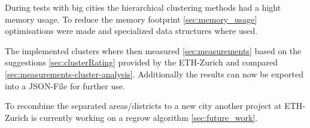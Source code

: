 During tests with big cities the hierarchical clustering methods had a hight memory usage. To reduce the memory footprint \ref{sec:memory_usage} optimisations were made and specialized data structures where used.

The implemented clusters where then measured \ref{sec:measurements} based on the suggestions \ref{sec:clusterRating} provided by the ETH-Zurich and compared \ref{sec:measurements-cluster-analysis}. Additionally the results can now be exported into a JSON-File for further use.

To recombine the separated areas/districts to a new city another project at ETH-Zurich is currently working on a regrow algorithm \ref{sec:future_work}. 